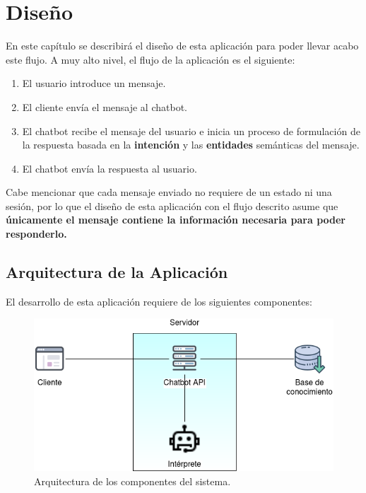 \chapter{Diseño}

En este capítulo se describirá el diseño de esta aplicación para poder llevar acabo este flujo. A muy alto nivel, el flujo de la aplicación es el siguiente:

\begin{enumerate}
    \item El usuario introduce un mensaje.
    \item El cliente envía el mensaje al chatbot.
    \item \label{itm:paso-respuesta} El chatbot recibe el mensaje del usuario e inicia un proceso de formulación de la respuesta basada en la \textbf{intención} y las \textbf{entidades} semánticas del mensaje.
    \item El chatbot envía la respuesta al usuario.
\end{enumerate}

Cabe mencionar que cada mensaje enviado no requiere de un estado ni una sesión, por lo que el diseño de esta aplicación con el flujo descrito asume que \textbf{únicamente el mensaje contiene la información necesaria para poder responderlo.}

\section{Arquitectura de la Aplicación}

El desarrollo de esta aplicación requiere de los siguientes componentes:

\begin{figure}[ht]
    \centering
    \includegraphics[scale=0.6]{images/5/arquitectura-general.png}
    \caption{Arquitectura de los componentes del sistema.}
    \label{fig:arquitectura-general}
\end{figure}

